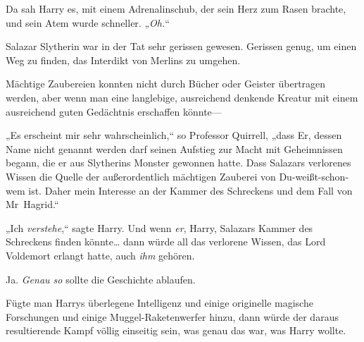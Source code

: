 Da sah Harry es, mit einem Adrenalinschub, der sein Herz zum Rasen brachte, und sein Atem wurde schneller. „\emph{Oh.}“

Salazar Slytherin war in der Tat sehr gerissen gewesen. Gerissen genug, um einen Weg zu finden, das Interdikt von Merlins zu umgehen.

Mächtige Zaubereien konnten nicht durch Bücher oder Geister übertragen werden, aber wenn man eine langlebige, ausreichend denkende Kreatur mit einem ausreichend guten Gedächtnis erschaffen könnte—

„Es erscheint mir sehr wahrscheinlich,“ so Professor Quirrell, „dass Er, dessen Name nicht genannt werden darf seinen Aufstieg zur Macht mit Geheimnissen begann, die er aus Slytherins Monster gewonnen hatte. Dass Salazars verlorenes Wissen die Quelle der außerordentlich mächtigen Zauberei von Du-weißt-schon-wem ist. Daher mein Interesse an der Kammer des Schreckens und dem Fall von Mr~Hagrid.“

„Ich \emph{verstehe},“ sagte Harry. Und wenn \emph{er}, Harry, Salazars Kammer des Schreckens finden könnte… dann würde all das verlorene Wissen, das Lord Voldemort erlangt hatte, auch \emph{ihm} gehören.

Ja. \emph{Genau so} sollte die Geschichte ablaufen.

Fügte man Harrys überlegene Intelligenz und einige originelle magische Forschungen und einige Muggel-Raketenwerfer hinzu, dann würde der daraus resultierende Kampf völlig einseitig sein, was genau das war, was Harry wollte.

